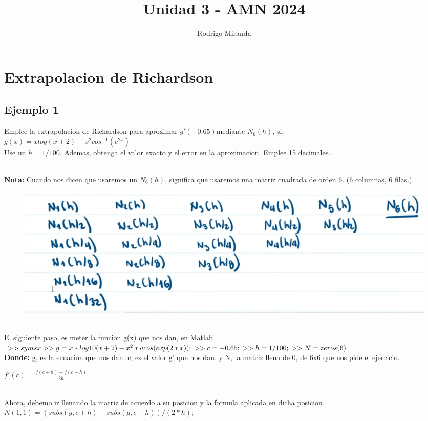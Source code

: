\documentclass{article}
\title{Unidad 3 - AMN 2024}
\author{Rodrigo Miranda}
\theoremstyle{mytheoremstyle}
\theoremstyle{mytheoremstyle}
\theoremstyle{myproblemstyle}
\begin{document}
    \maketitle
\section{Extrapolacion de Richardson}
\subsection{Ejemplo 1}
Emplee la extrapolacion de Richardson para aproximar $g'(-0.65)$mediante $ N_6(h)$, si:
\\ \indent \indent $g(x)=xlog(x+2)-x^2cos^{-1}(e^{2x})$
\noindent \\Use un $h=1/100$. Ademas, obtenga el valor exacto y el error en la aproximacion. Emplee 15 decimales.  

\noindent \\ \textbf{Nota:} Cuando nos dicen que usaremos un $N_6(h)$, significa que usaremos una matriz cuadrada de orden 6. (6 columnas, 6 filas.)

\begin{figure}[ht]
    \includegraphics[scale=0.6]{img/eje1_1.png}
\end{figure}
\noindent \\ El siguiente paso, es meter la funcion g(x) que nos dan, en Matlab
\\ $>> syms x\\
>> g = x*log10(x + 2) - x^2*acos(exp(2*x));\\
>> c=-0.65;\\
>> h=1/100;\\
>> N=zeros(6)\\$
\\ \textbf{Donde: }g, es la ecuacion que nos dan. c, es el valor g' que nos dan. y N, la matriz llena de 0, de 6x6 que nos pide el ejercicio.
\\ \begin{theorem}
    $f'(c)=\frac{f(c+h)-f(c-h)}{2h}$
\end{theorem}
\noindent \\ Ahora, debemo ir llenando la matriz de acuerdo a su posicion y la formula aplicada en dicha posicion.
\\ $N(1,1)=(subs(g,c+h)-subs(g,c-h))/(2*h);$
\end{document}
